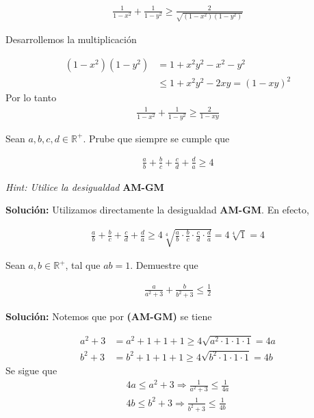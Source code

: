 \documentclass[12pt]{book}
\begin{document}
\begin{align*}
      \frac{1}{1-x^2}+\frac{1}{1-y^2}\geq \frac{2}{\sqrt{(1-x^2)(1-y^2)}}
\end{align*}

Desarrollemos la multiplicación

\begin{align*}
    (1-x^2)(1-y^2)&=1+x^2y^2-x^2-y^2 \\
    &\leq 1+x^2y^2-2xy=(1-xy)^2
\end{align*}
Por lo tanto
  \begin{align*}
        \frac{1}{1-x^2}+\frac{1}{1-y^2}\geq \frac{2}{1-xy}
    \end{align*}

\begin{prob}{}{}
    Sean $a,b,c,d \in \mathbb{R}^+$. Prube que siempre se cumple que 

    \begin{align*}
        \frac{a}{b}+\frac{b}{c}+\frac{c}{d}+\frac{d}{a} \geq 4
    \end{align*}

    \emph{Hint: Utilice la desigualdad} \textbf{AM-GM}
\end{prob}
\textbf{Solución:} Utilizamos directamente la  desigualdad \textbf{AM-GM}. En efecto,

\begin{align*}
      \frac{a}{b}+\frac{b}{c}+\frac{c}{d}+\frac{d}{a} \geq 4 \sqrt[4]{\frac{a}{b}\cdot \frac{b}{c}\cdot \frac{c}{d} \cdot \frac{d}{a}}= 4 \sqrt[4]{1}=4
\end{align*}

\begin{prob}{}{}
    Sean $a,b \in \mathbb{R}^+$, tal que $ab=1$. Demuestre que 

    \begin{align*}
        \frac{a}{a^2+3}+\frac{b}{b^2+3}\leq \frac{1}{2}
    \end{align*}
\end{prob}
\textbf{Solución:}
Notemos que por \textbf{(AM-GM)} se tiene

\begin{align*}
    a^2+3&=a^2+1+1+1 \geq 4 \sqrt{a^2\cdot1\cdot1\cdot1}=4a \\
    b^2+3&=b^2+1+1+1 \geq 4 \sqrt{b^2\cdot1\cdot1\cdot1}=4b
\end{align*}
Se sigue que
\begin{align*}
    4a \leq a^2 +3 \Longrightarrow \frac{1}{a^2+3} \leq \frac{1}{4a} \\
     4b \leq b^2 +3 \Longrightarrow \frac{1}{b^2+3} \leq \frac{1}{4b}
\end{align*}
\end{document}

